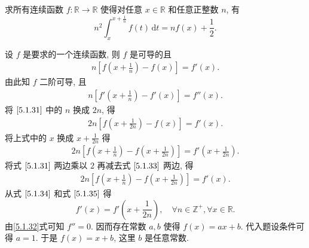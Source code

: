 \documentclass[../../main.tex]{subfiles}
\begin{document}
\begin{example}
求所有连续函数 \( f : \mathbb{R} \to \mathbb{R} \) 使得对任意 \( x \in \mathbb{R} \) 和任意正整数 \( n \), 有  
\[
n^2 \int_{x}^{x + \frac{1}{n}} f(t) \, \mathrm{d}t = n f(x) + \frac{1}{2}.
\]  
\end{example}
\begin{solution}
设 \( f \) 是要求的一个连续函数, 则 \( f \) 是可导的且  
\begin{align}
n \left[ f \left( x + \frac{1}{n} \right) - f(x) \right] = f'(x). \label{5.1.31}
\end{align}  
由此知 \( f \) 二阶可导, 且  
\begin{align}
n \left[ f' \left( x + \frac{1}{n} \right) - f'(x) \right] = f''(x). \label{5.1.32}
\end{align}  
将 \(\eqref{5.1.31}\) 中的 \( n \) 换成 \( 2n \), 得  
\begin{align}
2n \left[ f \left( x + \frac{1}{2n} \right) - f(x) \right] = f'(x). \label{5.1.33}
\end{align}  
将上式中的 \( x \) 换成 \( x + \frac{1}{2n} \) 得  
\begin{align}
2n \left[ f \left( x + \frac{1}{n} \right) - f \left( x + \frac{1}{2n} \right) \right] = f' \left( x + \frac{1}{2n} \right). \label{5.1.34}
\end{align}  
将式 \(\eqref{5.1.31}\) 两边乘以 \( 2 \) 再减去式 \(\eqref{5.1.33}\) 两边, 得  
\begin{align}
2n \left[ f \left( x + \frac{1}{n} \right) - f \left( x + \frac{1}{2n} \right) \right] = f'(x). \label{5.1.35}
\end{align}  
从式 \(\eqref{5.1.34}\) 和式 \(\eqref{5.1.35}\) 得  
\[
f'(x) = f' \left( x + \frac{1}{2n} \right), \quad \forall n \in \mathbb{Z}^+, \forall x \in \mathbb{R}.
\]  
由\eqref{5.1.32}式可知 \( f'' = 0 \). 因而存在常数 \( a, b \) 使得 \( f(x) = ax + b \). 代入题设条件可得 \( a = 1 \). 于是 \( f(x) = x + b \), 这里 \( b \) 是任意常数.

\end{solution}
\end{document}
